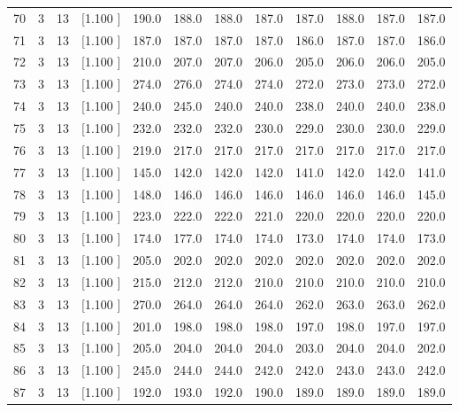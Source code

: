 \documentclass[12pt,a4paper]{article}
\begin{document}
\begin{center}
{\begin{tabular}{r r r r r r r r r r r r}
  70&  3& 13&[1.100     ]&   190.0&   188.0&   188.0&   187.0&   187.0&   188.0&   187.0&   187.0\\[-0.02in]
  71&  3& 13&[1.100     ]&   187.0&   187.0&   187.0&   187.0&   186.0&   187.0&   187.0&   186.0\\[-0.02in]
  72&  3& 13&[1.100     ]&   210.0&   207.0&   207.0&   206.0&   205.0&   206.0&   206.0&   205.0\\[-0.02in]
  73&  3& 13&[1.100     ]&   274.0&   276.0&   274.0&   274.0&   272.0&   273.0&   273.0&   272.0\\[-0.02in]
  74&  3& 13&[1.100     ]&   240.0&   245.0&   240.0&   240.0&   238.0&   240.0&   240.0&   238.0\\[-0.02in]
  75&  3& 13&[1.100     ]&   232.0&   232.0&   232.0&   230.0&   229.0&   230.0&   230.0&   229.0\\[-0.02in]
  76&  3& 13&[1.100     ]&   219.0&   217.0&   217.0&   217.0&   217.0&   217.0&   217.0&   217.0\\[-0.02in]
  77&  3& 13&[1.100     ]&   145.0&   142.0&   142.0&   142.0&   141.0&   142.0&   142.0&   141.0\\[-0.02in]
  78&  3& 13&[1.100     ]&   148.0&   146.0&   146.0&   146.0&   146.0&   146.0&   146.0&   145.0\\[-0.02in]
  79&  3& 13&[1.100     ]&   223.0&   222.0&   222.0&   221.0&   220.0&   220.0&   220.0&   220.0\\[-0.02in]
  80&  3& 13&[1.100     ]&   174.0&   177.0&   174.0&   174.0&   173.0&   174.0&   174.0&   173.0\\[-0.02in]
  81&  3& 13&[1.100     ]&   205.0&   202.0&   202.0&   202.0&   202.0&   202.0&   202.0&   202.0\\[-0.02in]
  82&  3& 13&[1.100     ]&   215.0&   212.0&   212.0&   210.0&   210.0&   210.0&   210.0&   210.0\\[-0.02in]
  83&  3& 13&[1.100     ]&   270.0&   264.0&   264.0&   264.0&   262.0&   263.0&   263.0&   262.0\\[-0.02in]
  84&  3& 13&[1.100     ]&   201.0&   198.0&   198.0&   198.0&   197.0&   198.0&   197.0&   197.0\\[-0.02in]
  85&  3& 13&[1.100     ]&   205.0&   204.0&   204.0&   204.0&   203.0&   204.0&   204.0&   202.0\\[-0.02in]
  86&  3& 13&[1.100     ]&   245.0&   244.0&   244.0&   242.0&   242.0&   243.0&   243.0&   242.0\\[-0.02in]
  87&  3& 13&[1.100     ]&   192.0&   193.0&   192.0&   190.0&   189.0&   189.0&   189.0&   189.0\\[-0.02in]

\end{tabular}}
\end{center}
\end{document}
